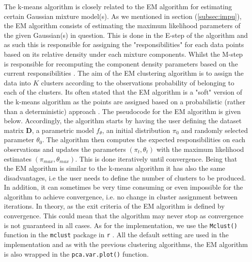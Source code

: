 \documentclass[../thesis.tex]{subfiles}
\begin{document}
\noindent The k-means algorithm is closely related to the EM algorithm \citep{dempster1977maximum} for estimating certain Gaussian mixture model(s). As we mentioned in section (\ref{subsec:impu}), the EM algorithm consists of estimating the maximum likelihood parameters of the given Gaussian(s) in question. This is done in the E-step of the algorithm and as such this is responsible for assigning the "responsibilities" for each data points based on its relative density under each mixture components. Whilst the M-step is responsible for recomputing the component density parameters based on the current responsibilities \citep{friedman2009elements}. The aim of the EM clustering algorithm is to assign the data into $K$ clusters according to the observations probability of belonging to each of the clusters. Its often stated that the EM algorithm is a "soft" version of the k-means algorithm as the points are assigned based on a probabilistic (rather than a deterministic) approach \citep{james2013introduction}. The pseudocode for the EM algorithm is given below. Accordingly, the algorithm starts by having the user defining the dataset matrix $\mathbf{D}$, a parametric model $f_\theta$, an initial distribution $\pi_0$ and randomly selected parameter $\theta_0$. The algorithm then computes the expected responsibilities on each observations and updates the parameters $(\pi_t, \theta_t)$ with the maximum likelihood estimates $(\pi_{max}, \theta_{max})$. This is done iteratively until convergence. Being that the EM algorithm is similar to the k-means algorithm it has also the same disadvantages, i.e the user needs to define the number of clusters to be produced. In addition, it can sometimes be very time consuming or even impossible for the algorithm to achieve convergence, i.e. no change in cluster assignment between iterations. In theory, as the exit criteria of the EM algorithm is defined by convergence. This could mean that the algorithm may never stop as convergence is not guaranteed in all cases.  As for the implementation, we use the \texttt{Mclust()} function in the \texttt{mclust} package in \texttt{r} \citep{mclust}. All the default setting are used in the implementation and as with the previous clustering algorithms, the EM algorithm is also wrapped in the \texttt{pca.var.plot()} function.\\
\end{document}

